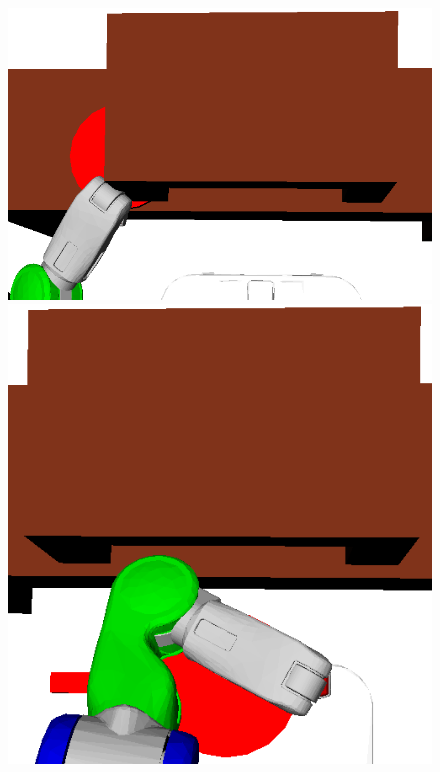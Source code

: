 \begin{figure}[t]
  \centering
    \noindent
    \includegraphics[scale=0.15]{images/fry_bad_grasp_pd1.png}\hspace{6mm}
    \includegraphics[scale=0.15]{images/fry_bad_grasp_pd2.png}

\end{figure}
